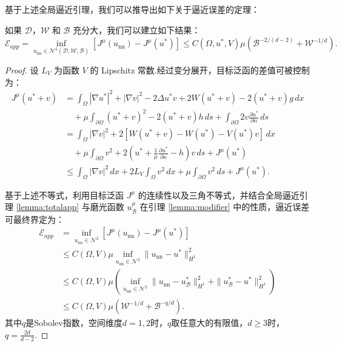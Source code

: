基于上述全局逼近引理，我们可以推导出如下关于逼近误差的定理：
\begin{theorem}[逼近误差]\label{thm:apperr}
如果 $\mathcal{D}$，$\mathcal{W}$ 和 $\mathcal{B}$ 充分大，我们可以建立如下结果：
\begin{equation*}
\mathcal{E}_{a p p}=\inf _{u_{\text{nn}} \in \mathcal{N}^{2}(\mathcal{D},\mathcal{W},\mathcal{B})}\left[J^{\mu}\left(u_{\text{nn}}\right)-J^{\mu}\left(u^{*}\right)\right]\leq C(\Omega,u^{*},V)\mu\left(\mathcal{B}^{-2/(d-2)}+\mathcal{W}^{-1/d}\right).
\end{equation*}
\end{theorem}
\begin{proof}
设 $L_{V}$ 为函数 $V$ 的 Lipschitz 常数.经过变分展开，目标泛函的差值可被控制为：
\begin{equation*}
\begin{aligned}
J^{\mu}\left(u^{*}+v\right) &= \int_{\Omega}|\nabla u^{*}|^{2}+|\nabla v|^{2}-2\Delta u^{*}v +2 W(u^{*}+v)-2 \left(u^{*}+v\right) g\,d x\\
&\quad +\mu \int_{\partial \Omega} \left(u^{*}+v\right)^{2}-2 \left(u^{*}+v\right) h\,ds + \int_{\partial \Omega}2v\frac{\partial u^{*}}{\partial n} \,d s\\
&= \int_{\Omega}|\nabla v|^{2}+2 \left[W(u^{*}+v)-W(u^{*})-V(u^{*})v\right]\,d x\\
&\quad +\mu \int_{\partial \Omega} v^{2}+2\left(u^{*}+\frac{1}{\mu}\frac{\partial u^{*}}{\partial n}-h\right)v \,d s+J^{\mu}\left(u^{*}\right)\\
&\leq \int_{\Omega}|\nabla v|^{2}\,dx+2L_{V}\int_{\Omega}v^{2}\,dx+\mu\int_{\partial \Omega}v^{2}\,ds+J^{\mu}\left(u^{*}\right).
\end{aligned}
\end{equation*}

基于上述不等式，利用目标泛函 $J^{\mu}$ 的连续性以及三角不等式，并结合全局逼近引理 \ref{lemma:totalapp} 与磨光函数 $u_{\mathcal{B}}^{\mu}$ 在引理 \ref{lemma:modifier} 中的性质，逼近误差可最终界定为：
\begin{equation*}
\begin{aligned}
\mathcal{E}_{a p p}&=\inf\limits _{u_{\text{nn}} \in \mathcal{N}^{2}}\left[J^{\mu}\left(u_{\text{nn}}\right)-J^{\mu}\left(u^{*}\right)\right]\\
&\leq C(\Omega,V)\mu\inf\limits _{u_{\text{nn}} \in \mathcal{N}^{2}}\|u_{\text{nn}}-u^{*}\|_{H^{1}}^{2}\\
&\leq C(\Omega,V)\mu\left(\inf\limits _{u_{\text{nn}} \in \mathcal{N}^{2}}\|u_{\text{nn}}-u^{*}_{\mathcal{B}}\|_{H^{1}}^{2}+\|u^{*}_{\mathcal{B}}-u^{*}\|_{H^{1}}^{2}\right)\\
&\leq C(\Omega,V)\mu\left(\mathcal{W}^{-1/d}+\mathcal{B}^{-q/d}\right).
\end{aligned}
\end{equation*}
其中$q$是Sobolev指数，空间维度$d=1,2$时，$q$取任意大的有限值，$d\geq 3$时，$q = \frac{2d}{d-2}$.
\end{proof}

